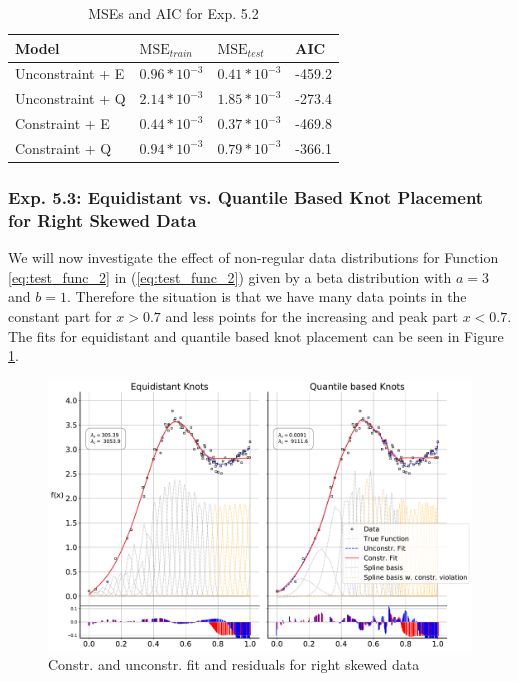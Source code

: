 \documentclass[10pt,a4paper]{article}
\begin{document}
\begin{table}[H]
	\centering
	\begin{tabular}{|l|l|l|l|}
		\hline
		\textbf{Model} & \textbf{$\text{MSE}_{train}$} & \textbf{$\text{MSE}_{test}$}  & \textbf{AIC} \\ \hline \toprule
		Unconstraint + E  & $0.96 * 10^{-3}$  & $0.41 * 10^{-3}$ & -459.2       \\ \hline
		Unconstraint + Q  & $2.14 * 10^{-3}$  & $1.85 * 10^{-3}$ & -273.4       \\ \hline
		Constraint + E    & $0.44 * 10^{-3}$  & $0.37 * 10^{-3}$ & -469.8       \\ \hline
		Constraint + Q    & $0.94 * 10^{-3}$  & $0.79 * 10^{-3}$ & -366.1      \\ \hline \bottomrule
	\end{tabular}
	\caption{MSEs and AIC for Exp. 5.2}
	\label{tab:metrics_52}
\end{table}


\subsubsection{Exp. 5.3: Equidistant vs. Quantile Based Knot Placement for Right Skewed Data}

We will now investigate the effect of non-regular data distributions for Function \ref{eq:test_func_2} in (\ref{eq:test_func_2}) given by a beta distribution with $a = 3$ and $b = 1$. Therefore the situation is that we have many data points in the constant part for $x > 0.7$ and less points for the increasing and peak part $x < 0.7$. The fits for equidistant and quantile based knot placement can be seen in Figure \ref{fig:fit_right_skew_250}. 

\begin{figure}[H]
	\centering
	\includegraphics[width=\columnwidth]{../thesisplots/exp_beta/exp_right_skewed_data_ndata_250_rseed_1.pdf}
	\caption{Constr. and unconstr. fit and residuals for right skewed data}
	\label{fig:fit_right_skew_250}
\end{figure}
\end{document}
